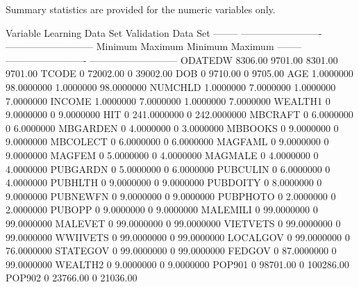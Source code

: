 \documentclass[
  11pt,
  a4paper,
  DIV=12,captions=tableheading,oneside,titlepage]{scrbook}
\let\oldverbatim\verbatim
\let\endoldverbatim\endverbatim
\renewenvironment{verbatim}{\footnotesize\oldverbatim}{\endoldverbatim}
\begin{document}
\begin{verbatim}
Summary statistics are provided for the numeric variables only. 

  Variable         Learning Data Set         Validation Data Set 
  --------     ------------------------- --------------------------- 
                   Minimum       Maximum       Minimum       Maximum 
  --------     ------------------------- --------------------------- 
  ODATEDW          8306.00       9701.00       8301.00       9701.00 
  TCODE                  0      72002.00             0      39002.00 
  DOB                    0       9710.00             0       9705.00 
  AGE            1.0000000    98.0000000     1.0000000    98.0000000 
  NUMCHLD        1.0000000     7.0000000     1.0000000     7.0000000 
  INCOME         1.0000000     7.0000000     1.0000000     7.0000000 
  WEALTH1                0     9.0000000             0     9.0000000 
  HIT                    0   241.0000000             0   242.0000000 
  MBCRAFT                0     6.0000000             0     6.0000000 
  MBGARDEN               0     4.0000000             0     3.0000000 
  MBBOOKS                0     9.0000000             0     9.0000000 
  MBCOLECT               0     6.0000000             0     6.0000000 
  MAGFAML                0     9.0000000             0     9.0000000 
  MAGFEM                 0     5.0000000             0     4.0000000 
  MAGMALE                0     4.0000000             0     4.0000000 
  PUBGARDN               0     5.0000000             0     6.0000000 
  PUBCULIN               0     6.0000000             0     4.0000000 
  PUBHLTH                0     9.0000000             0     9.0000000 
  PUBDOITY               0     8.0000000             0     9.0000000 
  PUBNEWFN               0     9.0000000             0     9.0000000 
  PUBPHOTO               0     2.0000000             0     2.0000000 
  PUBOPP                 0     9.0000000             0     9.0000000 
  MALEMILI               0    99.0000000             0    99.0000000 
  MALEVET                0    99.0000000             0    99.0000000 
  VIETVETS               0    99.0000000             0    99.0000000 
  WWIIVETS               0    99.0000000             0    99.0000000 
  LOCALGOV               0    99.0000000             0    76.0000000 
  STATEGOV               0    99.0000000             0    99.0000000 
  FEDGOV                 0    87.0000000             0    99.0000000 
  WEALTH2                0     9.0000000             0     9.0000000 
  POP901                 0      98701.00             0     100286.00 
  POP902                 0      23766.00             0      21036.00 

\end{verbatim}
\end{document}

